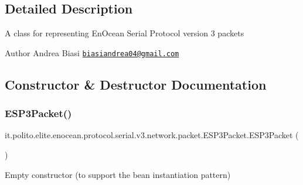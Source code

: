 \subsection{Detailed Description}
A class for representing En\+Ocean Serial Protocol version 3 packets

\begin{DoxyAuthor}{Author}
Andrea Biasi \href{mailto:biasiandrea04@gmail.com}{\tt biasiandrea04@gmail.\+com} 
\end{DoxyAuthor}


\subsection{Constructor \& Destructor Documentation}
\hypertarget{classit_1_1polito_1_1elite_1_1enocean_1_1protocol_1_1serial_1_1v3_1_1network_1_1packet_1_1_e_s_p3_packet_adac2e4b39e55cfae20a8e0fff4ae34b9}{}\label{classit_1_1polito_1_1elite_1_1enocean_1_1protocol_1_1serial_1_1v3_1_1network_1_1packet_1_1_e_s_p3_packet_adac2e4b39e55cfae20a8e0fff4ae34b9} 
\subsubsection{\texorpdfstring{E\+S\+P3\+Packet()}{ESP3Packet()}\hspace{0.1cm}{\footnotesize\ttfamily [1/2]}}
{\footnotesize\ttfamily it.\+polito.\+elite.\+enocean.\+protocol.\+serial.\+v3.\+network.\+packet.\+E\+S\+P3\+Packet.\+E\+S\+P3\+Packet (\begin{DoxyParamCaption}{ }\end{DoxyParamCaption})}

Empty constructor (to support the bean instantiation pattern) \hypertarget{classit_1_1polito_1_1elite_1_1enocean_1_1protocol_1_1serial_1_1v3_1_1network_1_1packet_1_1_e_s_p3_packet_a5c3beee96b2abedb42639614c0ad36b9}{}\label{classit_1_1polito_1_1elite_1_1enocean_1_1protocol_1_1serial_1_1v3_1_1network_1_1packet_1_1_e_s_p3_packet_a5c3beee96b2abedb42639614c0ad36b9} 
